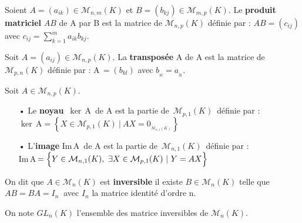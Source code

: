 \vspace{1.3cm}

Soient \(A=(a_{ik})\in\mathcal{M}_{n,m}(K)\) et \(B=(b_{kj})\in\mathcal{M}_{m,p}(K)\).
Le \textbf{produit matriciel} \(AB\) de A par B est la matrice de \(\mathcal{M}_{n,p}(K)\) définie par : \(AB=(c_{ij})\) avec \(\displaystyle c_{ij}=\sum_{k=1}^{m}a_{ik}b_{kj}\).

\vspace{1.2cm}

\noindent Soit \(A=(a_{ij})\in\mathcal{M}_{n,p}(K)\). La \textbf{transposée} A de A est la matrice de \(\mathcal{M}_{p,n}(K)\) définie par :
A\(\,=(b_{kl})\) avec \(\displaystyle b_{_{kl}}=a_{_{lk}}\). 

\vspace{1.2cm}

\noindent Soit \(A\in \mathcal{M}_{n,p}(K)\).\vspace{-0.1cm}
\begin{itemize}[leftmargin=1cm]
    \item[•] Le \textbf{noyau} \(\,\ker\,\)A\, de A est la partie de \(\,\mathcal{M}_{p,1}(K)\,\) définie par :\vspace{0.1cm}\\
    \(\ker\,\text{A}= \left\{ X\in\mathcal{M}_{p,1}(K) \ \rvert \ AX=0_{_{\mathcal{M}_{n,1}(K)}}\right\} \)\vspace{0.2cm}

    \item[•] L'\textbf{image} Im\,A\, de A est la partie de \(\,\mathcal{M}_{n,1}(K)\,\) définie par :\vspace{0.1cm}\\
    Im\,A\(\,=\Bigl\{ Y\in \mathcal{M}_{n,1}(K),\ \exists X\in \mathcal{M}_{p,1}(K) \ \rvert \ Y=AX \Bigr\}\)
\end{itemize}

\vspace{1cm}

\noindent On dit que \(A\in \mathcal{M}_n(K)\) est \textbf{inversible} \ssi il existe \(B\in \mathcal{M}_n(K)\) telle que\\ 
\(AB=BA=I_n\ \) avec \(I_n\) la matrice identité d'ordre n.\vspace{0.1cm}\\
\begin{small}
    On note \(GL_n(K)\) l'ensemble des matrice inversibles de \(\mathcal{M}_n(K)\).
\end{small}

